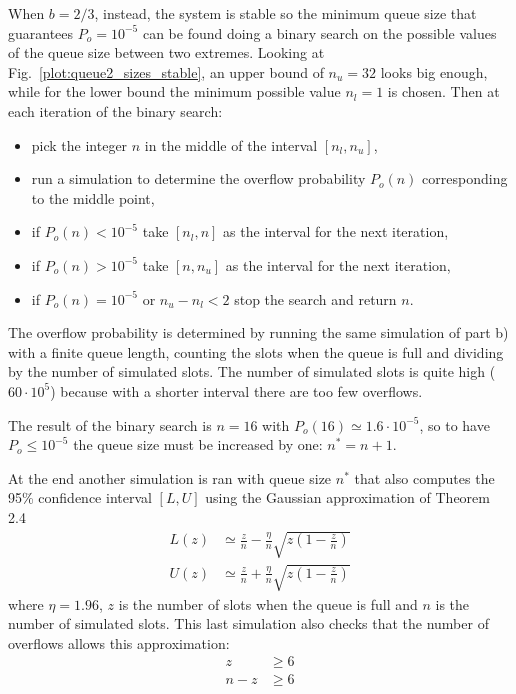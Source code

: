 \documentclass[a4paper,oneside]{article}
\renewcommand{\approx}[0]{\simeq}
\begin{document}
When $b = 2/3$, instead, the system is stable so the minimum queue
size that guarantees $P_o = 10^{-5}$ can be found doing a binary
search on the possible values of the queue size between two extremes.
Looking at Fig.~\ref{plot:queue2_sizes_stable}, an upper bound of $n_u
= 32$ looks big enough, while for the lower bound the minimum possible
value $n_l = 1$ is chosen. Then at each iteration of the binary
search:
\begin{itemize}
\item pick the integer $n$ in the middle of the interval $[n_l, n_u]$,
\item run a simulation to determine the overflow probability $P_o(n)$
  corresponding to the middle point,
\item if $P_o(n) < 10^{-5}$ take $[n_l, n]$ as the interval for the next iteration,
\item if $P_o(n) > 10^{-5}$ take $[n, n_u]$ as the interval for the next iteration,
\item if $P_o(n) = 10^{-5}$ or $n_u - n_l < 2$ stop the search and return $n$.
\end{itemize}
The overflow probability is determined by running the same simulation
of part b) with a finite queue length, counting the slots when the
queue is full and dividing by the number of simulated slots. The
number of simulated slots is quite high ($60 \cdot 10^5$) because with
a shorter interval there are too few overflows.

The result of the binary search is $n=16$ with $P_o(16) \approx
1.6\cdot10^{-5}$, so to have $P_o \leq 10^{-5}$ the queue size must be
increased by one: $n^* = n+1$.

At the end another simulation is ran with queue size $n^*$ that also
computes the 95\% confidence interval $[L, U]$ using the Gaussian
approximation of Theorem 2.4
\begin{align*}
  L(z) & \approx \frac{z}{n} - \frac{\eta}{n}\sqrt{z\left(1-\frac{z}{n}\right)} \\
  U(z) & \approx \frac{z}{n} + \frac{\eta}{n}\sqrt{z\left(1-\frac{z}{n}\right)}
\end{align*}
where $\eta = 1.96$, $z$ is the number of slots when the queue is full
and $n$ is the number of simulated slots. This last simulation also
checks that the number of overflows allows this approximation:
\begin{align*}
  z & \geq 6 \\
  n-z & \geq 6
\end{align*}
\end{document}
